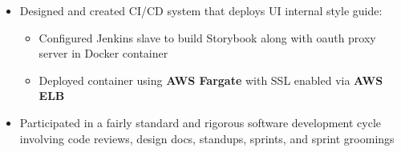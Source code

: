 \documentclass[10pt, oneside]{letter}
\begin{document}
\begin{adjustwidth}{0.1in}{0pt}
\begin{itemize}
\begin{itemize}
              \item {
                  Designed and created CI/CD system that deploys UI internal
                  style guide:
              }
                \begin{itemize}
                  \item {
                      Configured Jenkins slave to build Storybook along with
                      oauth proxy server in Docker container
                  }
                  \item {
                      Deployed container using \textbf{AWS Fargate} with SSL
                      enabled via \textbf{AWS ELB}
                  }
                \end{itemize}

              \item {
                Participated in a fairly standard and rigorous software development
                cycle involving code reviews, design docs, standups, sprints,
                and sprint groomings
              }


\end{itemize}
\end{itemize}
\end{adjustwidth}
\end{document}
